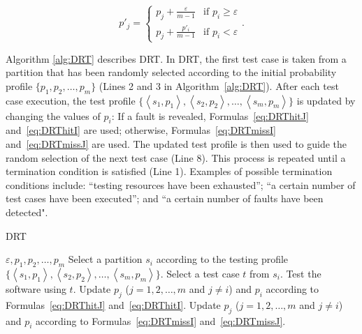 \documentclass[10pt,journal,compsoc]{IEEEtran}
\begin{document}
\begin{equation}
\label{eq:DRTmissJ}
p'_j =
\begin{cases}
p_j + \displaystyle\frac{\varepsilon}{m-1} & \text{if } p_i \geq \varepsilon \\
p_j + \displaystyle\frac{p'_i}{m-1} & \text{if } p_i < \varepsilon
\end{cases}.
\end{equation}

Algorithm \ref{alg:DRT} describes DRT.
In DRT, the first test case is taken from a partition that has been randomly selected according to the initial probability profile $\{p_1, p_2, \ldots, p_m\}$ (Lines 2 and 3 in Algorithm~\ref{alg:DRT}).
After each test case execution, the test profile $\{ \left \langle s_1,p_1 \right \rangle, \left \langle s_2,p_2 \right \rangle, \ldots, \left \langle s_m,p_m \right \rangle\}$ is updated by changing the values of $p_i$:
If a fault is revealed, Formulas~\ref{eq:DRThitJ} and~\ref{eq:DRThitI} are used;
otherwise, Formulas~\ref{eq:DRTmissI} and~\ref{eq:DRTmissJ} are used.
The updated test profile is then used to guide the random selection of the next test case (Line 8).
This process is repeated until a termination condition is satisfied (Line 1).
Examples of possible termination conditions include:
 ``testing resources have been exhausted'';
 ``a certain number of test cases have been executed''; and
 ``a certain number of faults have been detected".

\begin{algorithm}
    \caption{DRT}
    \label{alg:DRT}
    \begin{algorithmic}[1]
        \renewcommand{\algorithmicrequire}{\textbf{Input:}} %
	    \renewcommand{\algorithmicensure}{\textbf{Output:}}
        \renewcommand{\algorithmicendwhile}{\algorithmicend\_\algorithmicwhile}
		\renewcommand{\algorithmicendfor}{\algorithmicend\_\algorithmicfor}
		\renewcommand{\algorithmicendif}{\algorithmicend\_\algorithmicif}
		\renewcommand{\algorithmicthen}{}
		\renewcommand{\algorithmicdo}{}
        \REQUIRE $\varepsilon, p_1, p_2, \ldots, p_m$
        \STATE Select a partition $s_i$ according to the testing profile $\{ \left \langle s_1,p_1 \right \rangle, \left \langle s_2,p_2 \right \rangle, \ldots, \left \langle s_m,p_m \right \rangle\}$.
        \STATE Select a test case $t$ from $s_i$.
        \STATE Test the software using $t$.
        \STATE Update $p_j$ ($j = 1, 2, \ldots, m$ and $j \neq i$) and $p_i$ according to Formulas~\ref{eq:DRThitJ} and~\ref{eq:DRThitI}.
        \ELSE
        \STATE Update $p_j$ ($j = 1, 2, \ldots, m$ and $j \neq i$) and $p_i$ according to Formulas~\ref{eq:DRTmissI} and~\ref{eq:DRTmissJ}.
        \ENDIF
        \ENDWHILE
    \end{algorithmic}
\end{algorithm}
\end{document}
